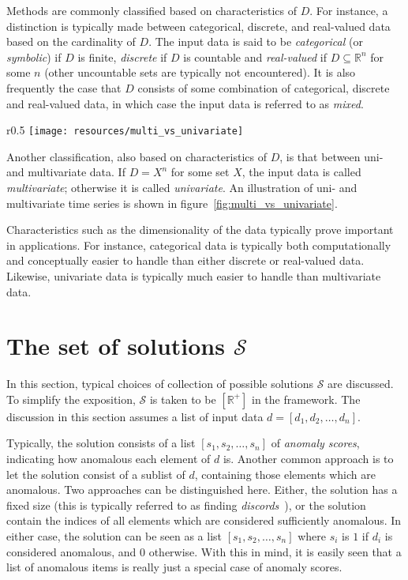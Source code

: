 Methods are commonly classified based on characteristics of $D$. For instance, a distinction is typically made between categorical, discrete, and real-valued data based on the cardinality of $D$. The input data is said to be \emph{categorical} (or \emph{symbolic}) if $D$ is finite, \emph{discrete} if $D$ is countable and \emph{real-valued} if $D \subseteq \mathbb{R}^n$ for some $n$ (other uncountable sets are typically not encountered). It is also frequently the case that $D$ consists of some combination of categorical, discrete and real-valued data, in which case the input data is referred to as \emph{mixed}\cite{TODO}.

\begin{wrapfigure}{r}{0.5\textwidth}
\changecaptionwidth
{}
\texttt{[image: resources/multi\_vs\_univariate]}
\caption[derp]{Two sine curves regarded as two separate univariate time series (dotted lines) and as one multivariate time series (solid lines).}
\label{fig:multi_vs_univariate}
\end{wrapfigure}

Another classification, also based on characteristics of $D$, is that between uni- and multivariate data. If $D = X^n$ for some set $X$, the input data is called \emph{multivariate}; otherwise it is called \emph{univariate}. An illustration of uni- and multivariate time series is shown in figure~\ref{fig:multi_vs_univariate}.

Characteristics such as the dimensionality of the data typically prove important in applications. For instance, categorical data is typically both computationally and conceptually easier to handle than either discrete or real-valued data. Likewise, univariate data is typically much easier to handle than multivariate data.

\section{The set of solutions $\mathcal{S}$}

In this section, typical choices of collection of possible solutions $\mathcal{S}$ are discussed. To simplify the exposition, $\mathcal{S}$ is taken to be $[\mathbb{R}^+]$ in the framework. The discussion in this section assumes a list of input data $d = [d_1, d_2, \dots, d_n]$.

Typically, the solution consists of a list $[s_1, s_2, \dots, s_n]$ of \emph{anomaly scores}, indicating how anomalous each element of $d$ is. Another common approach is to let the solution consist of a sublist of $d$, containing those elements which are anomalous. Two approaches can be distinguished here. Either, the solution has a fixed size (this is typically referred to as finding \emph{discords}~\cite{keogh1}), or the solution contain the indices of all elements which are considered sufficiently anomalous. In either case, the solution can be seen as a list $[s_1, s_2, \dots, s_n]$ where $s_i$ is $1$ if $d_i$ is considered anomalous, and $0$ otherwise. With this in mind, it is easily seen that a list of anomalous items is really just a special case of anomaly scores.


